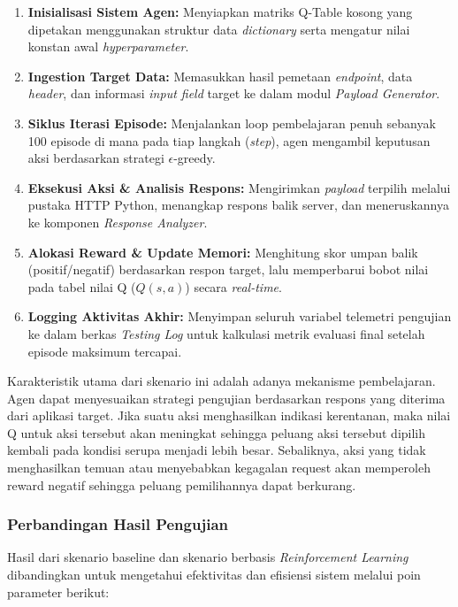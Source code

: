 \begin{enumerate}
    \item \textbf{Inisialisasi Sistem Agen:} Menyiapkan matriks Q-Table kosong yang dipetakan menggunakan struktur data \textit{dictionary} serta mengatur nilai konstan awal \textit{hyperparameter}.
    \item \textbf{Ingestion Target Data:} Memasukkan hasil pemetaan \textit{endpoint}, data \textit{header}, dan informasi \textit{input field} target ke dalam modul \textit{Payload Generator}.
    \item \textbf{Siklus Iterasi Episode:} Menjalankan loop pembelajaran penuh sebanyak 100 episode di mana pada tiap langkah (\textit{step}), agen mengambil keputusan aksi berdasarkan strategi $\epsilon$-greedy.
    \item \textbf{Eksekusi Aksi \& Analisis Respons:} Mengirimkan \textit{payload} terpilih melalui pustaka HTTP Python, menangkap respons balik server, dan meneruskannya ke komponen \textit{Response Analyzer}.
    \item \textbf{Alokasi Reward \& Update Memori:} Menghitung skor umpan balik (positif/negatif) berdasarkan respon target, lalu memperbarui bobot nilai pada tabel nilai Q ($Q(s,a)$) secara \textit{real-time}.
    \item \textbf{Logging Aktivitas Akhir:} Menyimpan seluruh variabel telemetri pengujian ke dalam berkas \textit{Testing Log} untuk kalkulasi metrik evaluasi final setelah episode maksimum tercapai.
\end{enumerate}

Karakteristik utama dari skenario ini adalah adanya mekanisme pembelajaran. Agen dapat menyesuaikan strategi pengujian berdasarkan respons yang diterima dari aplikasi target. Jika suatu aksi menghasilkan indikasi kerentanan, maka nilai Q untuk aksi tersebut akan meningkat sehingga peluang aksi tersebut dipilih kembali pada kondisi serupa menjadi lebih besar. Sebaliknya, aksi yang tidak menghasilkan temuan atau menyebabkan kegagalan request akan memperoleh reward negatif sehingga peluang pemilihannya dapat berkurang.

\subsubsection{Perbandingan Hasil Pengujian}

Hasil dari skenario baseline dan skenario berbasis \textit{Reinforcement Learning} dibandingkan untuk mengetahui efektivitas dan efisiensi sistem melalui poin parameter berikut:

